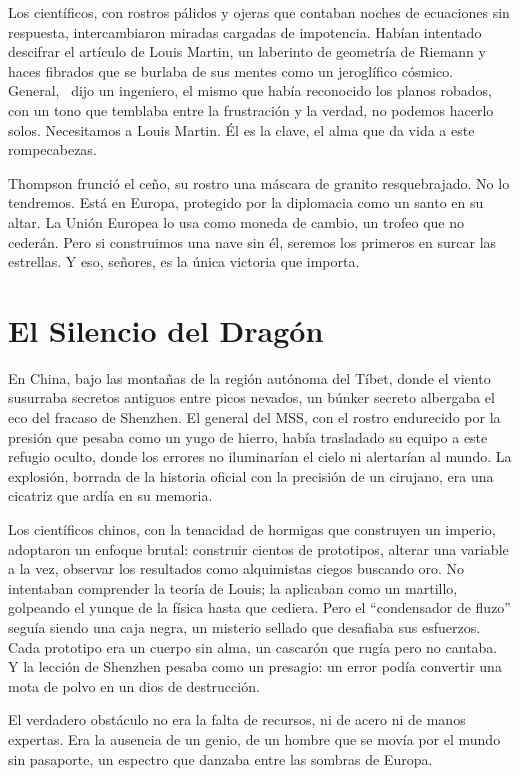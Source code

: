 Los científicos, con rostros pálidos y ojeras que contaban noches de ecuaciones sin respuesta, intercambiaron miradas cargadas de impotencia. Habían intentado descifrar el artículo de Louis Martin, un laberinto de geometría de Riemann y haces fibrados que se burlaba de sus mentes como un jeroglífico cósmico. \glqq General,\grqq~ dijo un ingeniero, el mismo que había reconocido los planos robados, con un tono que temblaba entre la frustración y la verdad, \glqq no podemos hacerlo solos. Necesitamos a Louis Martin. Él es la clave, el alma que da vida a este rompecabezas.\grqq

Thompson frunció el ceño, su rostro una máscara de granito resquebrajado. \glqq No lo tendremos. Está en Europa, protegido por la diplomacia como un santo en su altar. La Unión Europea lo usa como moneda de cambio, un trofeo que no cederán. Pero si construimos una nave sin él, seremos los primeros en surcar las estrellas. Y eso, señores, es la única victoria que importa.\grqq

\section{El Silencio del Dragón}

En China, bajo las montañas de la región autónoma del Tíbet, donde el viento susurraba secretos antiguos entre picos nevados, un búnker secreto albergaba el eco del fracaso de Shenzhen. El general del MSS, con el rostro endurecido por la presión que pesaba como un yugo de hierro, había trasladado su equipo a este refugio oculto, donde los errores no iluminarían el cielo ni alertarían al mundo. La explosión, borrada de la historia oficial con la precisión de un cirujano, era una cicatriz que ardía en su memoria.

Los científicos chinos, con la tenacidad de hormigas que construyen un imperio, adoptaron un enfoque brutal: construir cientos de prototipos, alterar una variable a la vez, observar los resultados como alquimistas ciegos buscando oro. No intentaban comprender la teoría de Louis; la aplicaban como un martillo, golpeando el yunque de la física hasta que cediera. Pero el “condensador de fluzo” seguía siendo una caja negra, un misterio sellado que desafiaba sus esfuerzos. Cada prototipo era un cuerpo sin alma, un cascarón que rugía pero no cantaba. Y la lección de Shenzhen pesaba como un presagio: un error podía convertir una mota de polvo en un dios de destrucción.

El verdadero obstáculo no era la falta de recursos, ni de acero ni de manos expertas. Era la ausencia de un genio, de un hombre que se movía por el mundo sin pasaporte, un espectro que danzaba entre las sombras de Europa.

